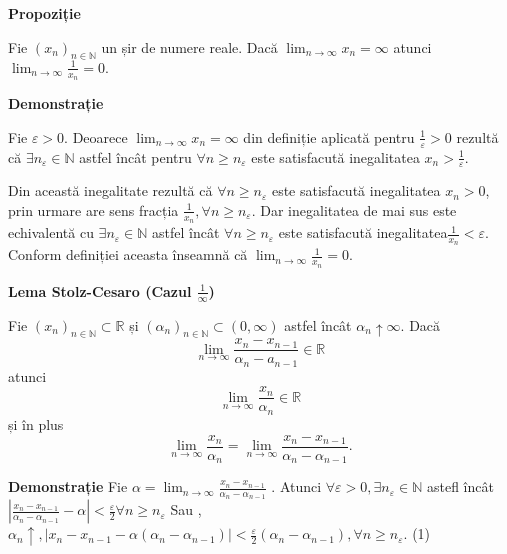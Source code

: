 \documentclass[a4paper,12pt,oneside]{report}
\begin{document}
\textbf{Propoziție}
 
Fie \((x_{n})_{n\in \mathbb{N}}\) un șir de numere reale. Dacă \(\lim_{n \to \infty }x_{n}=\infty\) atunci \( \lim_{n \to \infty }\frac{1}{x_{n}}=0.\) 

\textbf{Demonstrație} 

Fie \(\varepsilon > 0\). Deoarece \(\lim_{n \to \infty }x_{n}=\infty\) din definiție aplicată pentru \(\frac{1}{\varepsilon }> 0\) rezultă că \(\exists n_{\varepsilon }\in \mathbb{N}\) astfel încât pentru \(\forall n\geq n_{\varepsilon }\) este satisfacută inegalitatea \(x_{n}> \frac{1}{\varepsilon }\). 

Din această inegalitate rezultă că \(\forall n\geq n_{\varepsilon }\) este satisfacută inegalitatea \(x_{n}> 0\), prin urmare are sens fracția \(\frac{1}{x_{n}}, \forall n\geq n_{\varepsilon }\). Dar inegalitatea de mai sus este echivalentă cu \(\exists n_{\varepsilon }\in \mathbb{N}\) astfel încât \(\forall n\geq n_{\varepsilon }\) este satisfacută inegalitatea\( \frac{1}{x_{n}}< \varepsilon.\) Conform definiției aceasta înseamnă că \(\lim_{n \to \infty }\frac{1}{x_{n}}=0\).


\textbf{Lema Stolz-Cesaro (Cazul \(\frac{1}{\infty }\))}

Fie \(\left ( x_{n} \right )_{n\in \mathbb{N}}\subset \mathbb{R}\) și \(\left (\alpha _{n} \right )_{n\in \mathbb{N}}\subset \left ( 0,\infty \right )\) astfel încât \(\alpha _{n} \uparrow \infty\). 
Dacă 
\begin{displaymath}
  \lim_{n \to \infty }\frac{x_{n} - x_{n-1}}{\alpha _{n}-a_{n-1}}\in \mathbb{R}
\end{displaymath}
	atunci 
\begin{displaymath}
  \lim_{n \to \infty }\frac{x_{n}}{ \alpha _{n}}\in \mathbb{R} 
\end{displaymath}
	și în plus 
\begin{displaymath}
  \lim_{n \to \infty }\frac{x_{n}}{ \alpha _{n}}= \lim_{n \to \infty }\frac{x_{n} - x_{n-1}}{ \alpha _{n}- \alpha _{n-1}}.
\end{displaymath}


\textbf{Demonstrație} 
Fie \(\alpha = \lim_{n \to \infty }\frac{x_{n}-x_{n-1}}{\alpha _{n}-\alpha _{n-1}}\) . 
Atunci \(\forall \varepsilon > 0,\exists n_{\varepsilon }\in \mathbb{N}\) astefl încât \(\left | \frac{x_{n}-x_{n-1}}{\alpha _{n}- \alpha _{n-1}} - \alpha \right |< \frac{\varepsilon }{2} \forall  n\geq n_{\varepsilon  }\)
Sau , \(\alpha _{n} \uparrow, 
\left | x_{n}- x_{n-1 }- \alpha \left ( \alpha _{n}-\alpha _{n-1} \right ) \right | < \frac{\varepsilon }{2}\left ( \alpha _{n}- \alpha _{n-1} \right ), \forall n\geq n_{\varepsilon }\). (1) 
\end{document}
